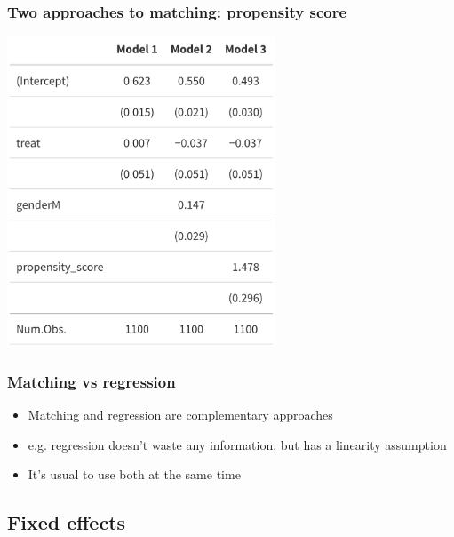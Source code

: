 \documentclass[aspectratio=43]{beamer}
\begin{document}
\begin{frame}
\frametitle{Two approaches to matching: propensity score}
\centering

\includegraphics[width = 0.6\textwidth]{../img/propscore2}

\end{frame}

\begin{frame}
\frametitle{Matching vs regression}
\centering

\begin{itemize}
  \item Matching and regression are complementary approaches
  \item e.g. regression doesn't waste any information, but has a linearity assumption
  \item It's usual to use both at the same time
\end{itemize}

\end{frame}

\subsection{Fixed effects}
\end{document}
